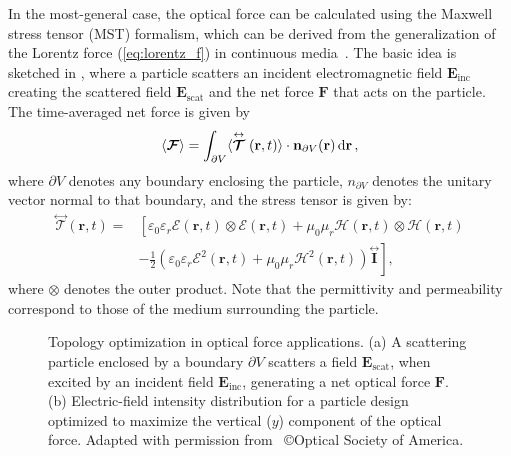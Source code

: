 In the most-general case, the optical force can be calculated using the Maxwell stress tensor (MST) formalism, which can be derived from the generalization of the Lorentz force (\eqref{eq:lorentz_f}) in continuous media~\cite{novotny}.
The basic idea is sketched in , where
a particle scatters an incident electromagnetic field $\mathbf{E}_\text{inc}$ creating the scattered field $\mathbf{E}_\text{scat}$ and the net force $\mathbf{F}$ that acts
on the particle. The time-averaged net force is given by
\begin{equation}\label{eq:f_MST}
    \langle\bm{\mathcal{F}}\rangle=\int_{\partial V}\langle\stackrel{\leftrightarrow}{\bm{\mathcal{T}}}(\mathbf{r}, t)\rangle \cdot \mathbf{n}_{\partial V}(\mathbf{r}) \mathop{}\!\text{d} \mathbf{r}\,,
\end{equation}
where $\partial V$ denotes any boundary enclosing the particle, $n_{\partial V}$ denotes the unitary vector normal to that boundary, and
the stress tensor is given by:
\begin{equation}
    \begin{aligned}
        \stackrel{\leftrightarrow}{\bm{\mathcal{T}}}(\mathbf{r}, t)= & {\left[\varepsilon_0 \varepsilon_r \mathcal{E}(\mathbf{r}, t) \otimes \mathcal{E}(\mathbf{r}, t)+\mu_0 \mu_r \mathcal{H}(\mathbf{r}, t) \otimes \mathcal{H}(\mathbf{r}, t)\right.} \\
    & \left.-\frac{1}{2}\left(\varepsilon_0 \varepsilon_r \mathcal{E}^2(\mathbf{r}, t)+\mu_0 \mu_r \mathcal{H}^2(\mathbf{r}, t)\right) \stackrel{\leftrightarrow}{\mathbf{I}}\right],
    \end{aligned}
\end{equation}
where $\otimes$ denotes the outer product. Note that the permittivity and permeability correspond to those of the medium surrounding the particle.

\begin{figure}[tb]
    \centering
    \caption{Topology optimization in optical force applications. (a) A scattering particle 
    enclosed by a boundary $\partial V$ scatters a field $\mathbf{E}_\text{scat}$, when excited by an incident field $\mathbf{E}_\text{inc}$, 
    generating a net optical force $\mathbf{F}$. (b) Electric-field intensity distribution for a particle design optimized to maximize the vertical ($y$)
    component of the optical force. Adapted with permission from~\cite{ownpub2} \copyright Optical Society of America.}
    \label{fig:eng_res}
\end{figure}

